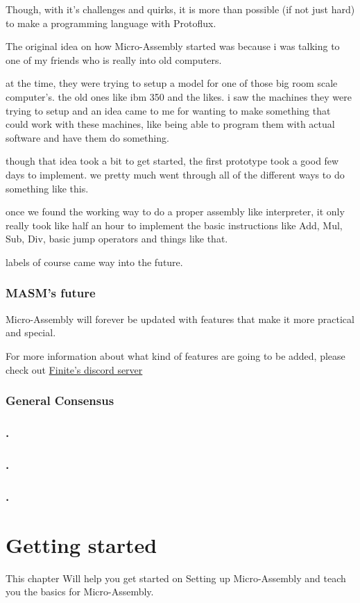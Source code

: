 \documentclass[a4paper,11pt]{book}
\begin{document}
Though, with it's challenges and quirks, it is more than possible (if not just hard) to make a programming language with Protoflux.

The original idea on how Micro-Assembly started was because i was talking to one of my friends who is really into old computers.

at the time, they were trying to setup a model for one of those big room scale computer's.
the old ones like ibm 350 and the likes.
i saw the machines they were trying to setup and an idea came to me for wanting to make something that could
work with these machines, like being able to program them with actual software and have them do something.

though that idea took a bit to get started, the first prototype took a good few days to implement.
we pretty much went through all of the different ways to do something like this. 

once we found the working way to do a proper assembly like interpreter, it only really took like half an hour to implement the basic instructions like Add, Mul, Sub, Div, basic jump operators and things like that.

labels of course came way into the future.

\subsection{MASM's future}
Micro-Assembly will forever be updated with features that make it more practical and special.

For more information about what kind of features are going to be added, please check out
\hyperref{https://discord.finite.ovh}{}{}{Finite's discord server}


\subsection{General Consensus}
\subsection{.}
\subsection{.}
\subsection{.}

\chapter{Getting started}
This chapter Will help you get started on Setting up Micro-Assembly and teach you the basics for Micro-Assembly.
\end{document}
